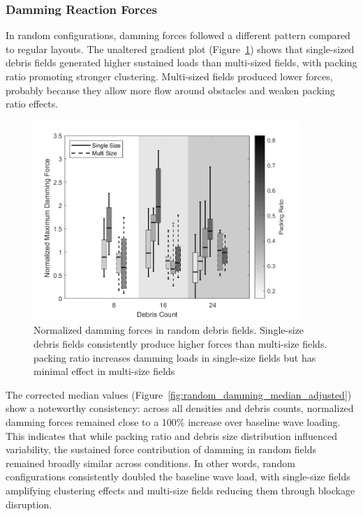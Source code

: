 \documentclass{article}
\begin{document}
{\subsubsection{Damming Reaction Forces} 
In random configurations, damming forces followed a different pattern compared to regular layouts. The unaltered gradient plot (Figure~\ref{fig:random_damming_gradient}) shows that single-sized debris fields generated higher sustained loads than multi-sized fields, with packing ratio promoting stronger clustering. Multi-sized fields produced lower forces, probably because they allow more flow around obstacles and weaken packing ratio effects.

\begin{figure}[htbp]
    \centering
    \includegraphics[width=0.9\textwidth]{Damming_Random_Single_vs_Multi_ByDensityGradient.png}
    \caption{Normalized damming forces in random debris fields. Single-size debris fields consistently produce higher forces than multi-size fields. packing ratio increases damming loads in single-size fields but has minimal effect in multi-size fields}
    \label{fig:random_damming_gradient}
\end{figure}

The corrected median values (Figure~\ref{fig:random_damming_median_adjusted}) show a noteworthy consistency: across all densities and debris counts, normalized damming forces remained close to a 100\% increase over baseline wave loading. This indicates that while packing ratio and debris size distribution influenced variability, the sustained force contribution of damming in random fields remained broadly similar across conditions. In other words, random configurations consistently doubled the baseline wave load, with single-size fields amplifying clustering effects and multi-size fields reducing them through blockage disruption.

}
\end{document}
